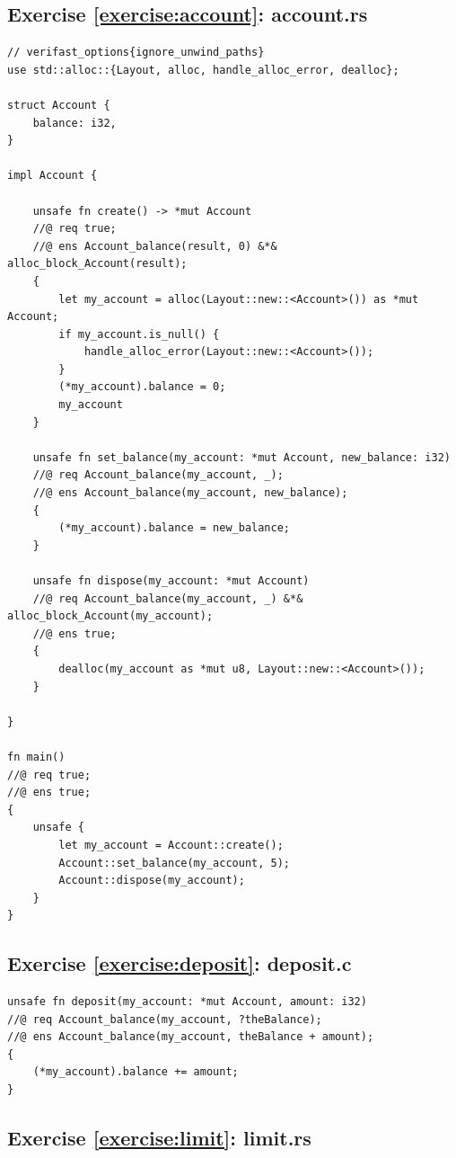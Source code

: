 \documentclass{article}
\begin{document}
\subsection{Exercise \ref{exercise:account}: account.rs}

\begin{lstlisting}
// verifast_options{ignore_unwind_paths}
use std::alloc::{Layout, alloc, handle_alloc_error, dealloc};

struct Account {
    balance: i32,
}

impl Account {

    unsafe fn create() -> *mut Account
    //@ req true;
    //@ ens Account_balance(result, 0) &*& alloc_block_Account(result);
    {
        let my_account = alloc(Layout::new::<Account>()) as *mut Account;
        if my_account.is_null() {
            handle_alloc_error(Layout::new::<Account>());
        }
        (*my_account).balance = 0;
        my_account
    }

    unsafe fn set_balance(my_account: *mut Account, new_balance: i32)
    //@ req Account_balance(my_account, _);
    //@ ens Account_balance(my_account, new_balance);
    {
        (*my_account).balance = new_balance;
    }

    unsafe fn dispose(my_account: *mut Account)
    //@ req Account_balance(my_account, _) &*& alloc_block_Account(my_account);
    //@ ens true;
    {
        dealloc(my_account as *mut u8, Layout::new::<Account>());
    }

}

fn main()
//@ req true;
//@ ens true;
{
    unsafe {
        let my_account = Account::create();
        Account::set_balance(my_account, 5);
        Account::dispose(my_account);
    }
}
\end{lstlisting}

\subsection{Exercise \ref{exercise:deposit}: deposit.c}

\begin{lstlisting}
unsafe fn deposit(my_account: *mut Account, amount: i32)
//@ req Account_balance(my_account, ?theBalance);
//@ ens Account_balance(my_account, theBalance + amount);
{
    (*my_account).balance += amount;
}
\end{lstlisting}

\subsection{Exercise \ref{exercise:limit}: limit.rs}
\end{document}
